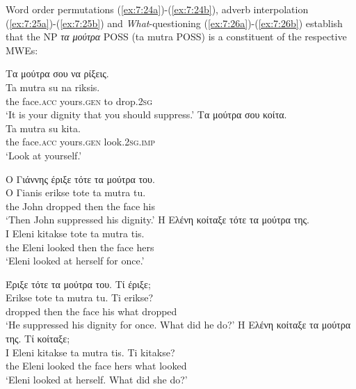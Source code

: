 \documentclass[output=paper]{langsci/langscibook}
\begin{document}
Word order permutations (\ref{ex:7:24a})-(\ref{ex:7:24b}), adverb interpolation (\ref{ex:7:25a})-(\ref{ex:7:25b}) and \textit{What}-questioning (\ref{ex:7:26a})-(\ref{ex:7:26b}) establish that the NP \textit{τα μούτρα} POSS (ta mutra POSS) is a constituent of the respective MWEs:

\ea%
    \label{ex:7:24}
\ea  \label{ex:7:24a}
\glll  Τα μούτρα σου να ρίξεις. \\
Ta mutra su na riksis.\\
                the face.\textsc{acc} yours.\textsc{gen} to drop.\textsc{2sg}\\
\glt             `It is your dignity that you should suppress.'
\ex  \label{ex:7:24b}
\glll Τα μούτρα σου κοίτα.\\
Ta mutra su kita.\\
                the face.\textsc{acc} yours.\textsc{gen} look.\textsc{2sg.imp}\\
\glt            `Look at yourself.'
\z
\z

\ea%
    \label{ex:7:25}
\ea     \label{ex:7:25a}

\glll Ο Γιάννης έριξε τότε τα μούτρα του.\\
O Γianis erikse tote ta mutra tu.\\
                 the John dropped then the face his \\
\glt             `Then John suppressed his dignity.'
\ex     \label{ex:7:25b}
\glll Η Ελένη κοίταξε τότε τα μούτρα της.\\
I Eleni kitakse tote ta mutra tis.\\
                 the Eleni looked then the face hers\\
\glt             `Eleni looked at herself for once.'
\z
\z

\ea%
    \label{ex:7:26}
\ea   \label{ex:7:26a}

\glll Έριξε τότε τα μούτρα του. Τί έριξε;\\
Erikse tote ta mutra tu. Ti erikse?\\
                 dropped then the face his what dropped\\
\glt                `He suppressed his dignity for once. What did he do?'
\ex   \label{ex:7:26b}
\glll Η Ελένη κοίταξε τα μούτρα της. Τί κοίταξε; \\
I Eleni kitakse ta mutra tis. Ti  kitakse?\\
                 the Eleni looked the face hers what looked \\
 \glt               `Eleni looked at herself. What did she do?'
\z
\z
\end{document}
